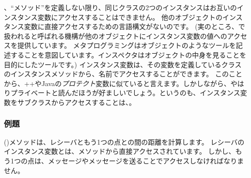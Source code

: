 \documentclass[a4paper,10pt,twoside]{book}
\begin{document}
、``メソッド''を定義しない限り、同じクラスの2つのインスタンスはお互いのインスタンス変数にアクセスすることはできません。
他のオブジェクトのインスタンス変数に直接アクセスするための言語構文がないのです。
(実のところ、で扱われると呼ばれる機構が他のオブジェクトにインスタンス変数の値へのアクセスを提供しています。
メタプログラミングはオブジェクトのようなツールを記述することを意図しています。インスペクタはオブジェクトの中身を見ることを目的にしたツールです。)
インスタンス変数は、その変数を定義しているクラスのインスタンスメソッドから、名前でアクセスすることができます。
このことから、++やJavaの\emph{プロテクト}変数に似ていると言えます。しかしながら、やはりプライベートと読んだほうが好ましいでしょう。というのも、インスタンス変数をサブクラスからアクセスすることは、。

\subsubsection{例題}
 ()メソッドは、レシーバともう1つの点との間の距離を計算します。
レシーバのインスタンス変数とは、メソッドから直接アクセスされています。
しかし、もう1つの点は、メッセージやメッセージを送ることでアクセスしなければなりません。
\end{document}
